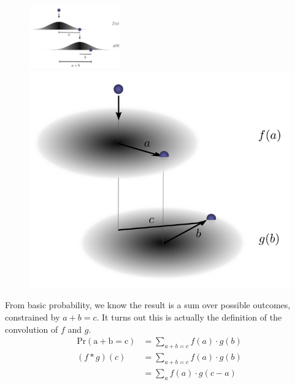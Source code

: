 \documentclass[11pt]{article}
\begin{document}
\begin{figure}[h!]
	\centering
	\includegraphics[width=0.35\textwidth]{figs/ColahBall.PNG}
	\hspace{2cm}
	\includegraphics[height=0.25\textwidth]{figs/ColahBall3.PNG}
\end{figure}

From basic probability, we know the result is a sum over possible outcomes, constrained by $a + b = c$. It turns out this is actually the definition of the convolution of $f$ and $g$. 
\begin{align}
\mathrm{Pr(a + b = c)} &= \sum_{a + b = c} f(a) \cdot g(b) \\
(f * g)(c) &= \sum_{a + b = c} f(a) \cdot g(b)\\
&= \sum_a f(a) \cdot g(c - a)
\end{align}
\end{document}
